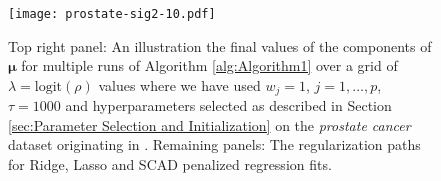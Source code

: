\documentclass[11pt]{article}
\newtheorem{Main Result}{Main Result}
\def\vectorfonttwo{\boldsymbol}
\def\vmu{{\vectorfonttwo \mu}}                   %
\begin{document}
\begin{figure}[h]
	\centering
	\texttt{[image: prostate-sig2-10.pdf]}
	\caption{Top right panel: An illustration the final values of the components of $\vmu$ for
		multiple runs of Algorithm \ref{alg:Algorithm1} over a grid of $\lambda=\mbox{logit}(\rho)$ values
		where we have used $w_j=1$, $j=1,\ldots,p$, $\tau=1000$ and hyperparameters
		selected as described in Section \ref{sec:Parameter Selection and Initialization}
		on the {\it prostate cancer} dataset originating in \cite{Stamey1989}.
		Remaining panels: The regularization paths for Ridge, Lasso
		and SCAD penalized regression fits.}
	\label{fig:01}
\end{figure}
\end{document}

